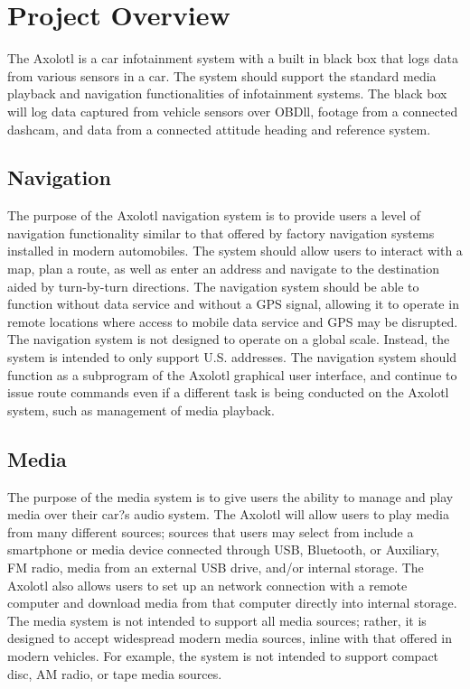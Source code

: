 \documentclass[onecolumn, draftclsnofoot,10pt, compsoc]{IEEEtran}
\begin{document}
\newpage
{}
\tableofcontents
\clearpage

\section{Project Overview}
The Axolotl is a car infotainment system with a built in black box that logs data from various sensors in a car. The system should support the standard media playback and navigation functionalities of infotainment systems. The black box will log data captured from vehicle sensors over OBDll, footage from a connected dashcam, and data from a connected attitude heading and reference system.

\subsection{Navigation}
The purpose of the Axolotl navigation system is to provide users a level of navigation functionality similar to that offered by factory navigation systems installed in modern automobiles. The system should allow users to interact with a map, plan a route, as well as enter an address and navigate to the destination aided by turn-by-turn directions. The navigation system should be able to function without data service and without a GPS signal, allowing it to operate in remote locations where access to mobile data service and GPS may be disrupted.
The navigation system is not designed to operate on a global scale. Instead, the system is intended to only support U.S. addresses. The navigation system should function as a subprogram of the Axolotl graphical user interface, and continue to issue route commands even if a different task is being conducted on the Axolotl system, such as management of media playback.

\subsection{Media}
The purpose of the media system is to give users the ability to manage and play media over their car?s audio system. The Axolotl will allow users to play media from many different sources; sources that users may select from include a smartphone or media device connected through USB, Bluetooth, or Auxiliary, FM radio, media from an external USB drive, and/or internal storage. The Axolotl also allows users to set up an network connection with a remote computer and download media from that computer directly into internal storage.
The media system is not intended to support all media sources; rather, it is designed to accept widespread modern media sources, inline with that offered in modern vehicles. For example, the system is not intended to support compact disc, AM radio, or tape media sources.
\end{document}
